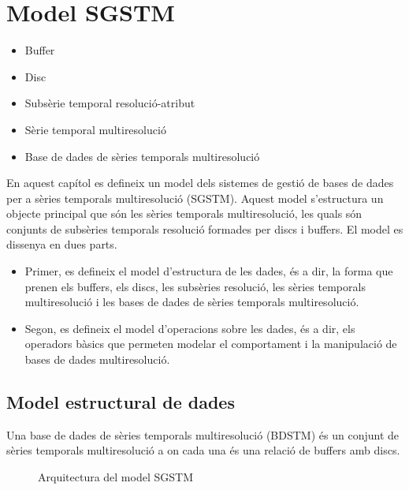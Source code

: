 \chapter{Model SGSTM}
\label{cap:model:sgstm}


\begin{itemize}
\item Buffer
\item Disc
\item Subsèrie temporal resolució-atribut
\item Sèrie temporal multiresolució
\item Base de dades de sèries temporals multiresolució
\end{itemize}



En aquest capítol es defineix un model dels sistemes de gestió de
bases de dades per a sèries temporals multiresolució (SGSTM). Aquest
model s'estructura un objecte principal que són les sèries temporals
multiresolució, les quals són conjunts de subsèries temporals
resolució formades per discs i buffers. El model es dissenya en dues
parts.

\begin{itemize}
\item Primer, es defineix el model d'estructura de les dades, és a
  dir, la forma que prenen els buffers, els discs, les subsèries
  resolució, les sèries temporals multiresolució i les bases de dades
  de sèries temporals multiresolució.
\item Segon, es defineix el model d'operacions sobre les dades, és a
  dir, els operadors bàsics que permeten modelar el comportament i la
  manipulació de bases de dades multiresolució.
\end{itemize}





\section{Model estructural de dades}

Una base de dades de sèries temporals multiresolució (BDSTM) és un
conjunt de sèries temporals multiresolució a on cada una és una
relació de buffers amb discs.

\begin{figure}[tp]
\centering

\caption{Arquitectura del model SGSTM}
\label{fig:model:bdstm}
\end{figure}


